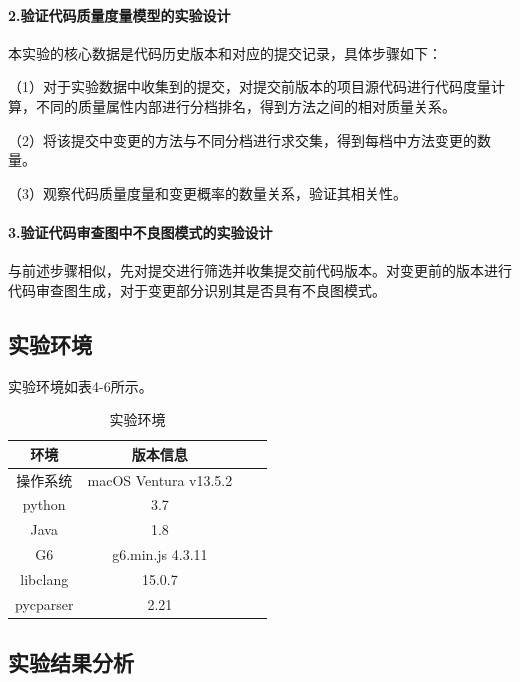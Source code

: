 \paragraph{2.验证代码质量度量模型的实验设计}  本实验的核心数据是代码历史版本和对应的提交记录，具体步骤如下：

\noindent （1）对于实验数据中收集到的提交，对提交前版本的项目源代码进行代码度量计算，不同的质量属性内部进行分档排名，得到方法之间的相对质量关系。

\noindent （2）将该提交中变更的方法与不同分档进行求交集，得到每档中方法变更的数量。

\noindent （3）观察代码质量度量和变更概率的数量关系，验证其相关性。

\paragraph{3.验证代码审查图中不良图模式的实验设计} 

与前述步骤相似，先对提交进行筛选并收集提交前代码版本。对变更前的版本进行代码审查图生成，对于变更部分识别其是否具有不良图模式。

\subsection{实验环境}


实验环境如表4-6所示。

\begin{table}[htbp]
\caption{实验环境}
\vspace{0.5em}\centering\wuhao
\begin{tabular}{cccc}
\toprule
    环境 & 版本信息 \\
\midrule
操作系统 & macOS Ventura v13.5.2  \\
python & 3.7   \\
Java & 1.8   \\
G6 & g6.min.js 4.3.11  \\  
libclang & 15.0.7  \\ 
pycparser & 2.21  \\
\bottomrule
\end{tabular}
\end{table}



\subsection{实验结果分析}

